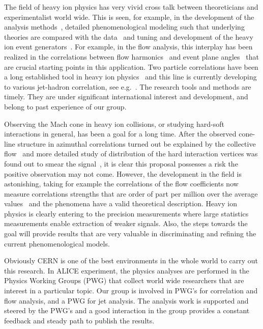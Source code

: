 The field of heavy ion physics has very vivid cross talk between theoreticians and experimentalist world wide. This is seen, for example, in the development of the analysis methods~\cite{Poskanzer:1998yz,Bilandzic:2010jr}, detailed phenomenological modeling such that underlying theories are compared with the data~\cite{Burke:2013yra,Renk:2011gj,Niemi:2015qia} and tuning and development of the heavy ion event generators~\cite{Gyulassy:1994ew,Lin:2004en,Lokhtin2006}. For example, in the flow analysis, this interplay has been realized in the correlations between flow harmonics~\cite{Poskanzer:1998yz,ALICE:2011ab} and event plane angles~\cite{Aad:2014fla,Bhalerao:2014xra} that are crucial starting points in this application. Two particle correlations have been a long established tool in heavy ion physics~\cite{PhysRevLett.95.152301,PhysRevLett.97.052301} and this line is currently developing to various jet-hadron correlation, see e.g.~\cite{Khachatryan:2016tfj}. The research tools and methods are timely. They are under significant international interest and development, and belong to past experience of our group.

Observing the Mach cone in heavy ion collisions, or studying hard-soft interactions in general, has been a goal for a long time. After the observed cone-line structure in azimuthal correlations turned out be explained by the collective flow~\cite{ALICE:2011ab} and more detailed study of distribution of the hard interaction vertices was found out to smear the signal~\cite{Tachibana:2015qxa}, it is clear this proposal possesses a risk the positive observation may not come. However, the development in the field is astonishing, taking for example the correlations of the flow coefficients now measure correlations strengths that are order of part per million over the average values~\cite{ALICE:2016kpq} and the phenomena have a valid theoretical description. Heavy ion physics is clearly entering to the precision measurements where large statistics measurements enable extraction of weaker signals. Also, the steps towards the goal will provide results that are very valuable in discriminating and refining the current phenomenological models.

Obviously CERN is one of the best environments in the whole world to carry out this research. In ALICE experiment, the physics analyses are performed in the Physics Working Groups (PWG) that collect world wide researchers that are interest in a particular topic. Our group is involved in PWG's for correlation and flow analysis, and a PWG for jet analysis. The analysis work is supported and steered by the PWG's and a good interaction in the group provides a constant feedback and steady path to publish the results.

